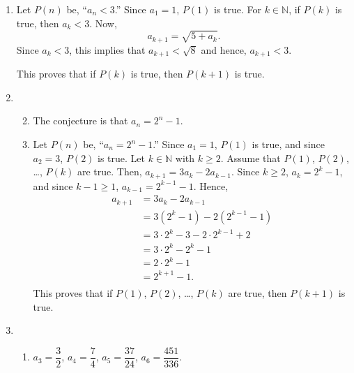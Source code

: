 \begin{enumerate}
\item Let $P \left( n \right)$ be, ``$a_n < 3$.''  Since $a_1 = 1$, $P \left( 1 \right)$ is true.  For $k \in \mathbb{N}$, if $P \left( k \right)$ is true, then $a_k < 3$.  Now,
\[
a_{k+1} = \sqrt{5 + a_k}.
\] 
Since $a_k < 3$, this implies that $a_{k+1} < \sqrt{8}$ and hence, $a_{k+1} < 3$.

This proves that if $P \left( k \right)$ is true, then $P \left( k + 1\right)$ is true.





\item 
\begin{enumerate} \setcounter{enumii}{1}
\item The conjecture is that $a_n = 2^n - 1$.

\item Let $P \left( n \right)$ be, ``$a_n = 2^n - 1$.''  Since $a_1 = 1$, $P \left( 1 \right)$ is true, and since $a_2 = 3$, $P \left( 2 \right)$ is true.  Let $k \in \mathbb{N}$ with $k \geq 2$.  Assume that $P \left( 1 \right)$, $P \left( 2 \right)$, \ldots, $P \left( k \right)$ are true.  Then, $a_{k+1} = 3 a_k - 2 a_{k-1}$.  Since $k \geq 2$, $a_k = 2^k - 1$, and since $k - 1 \geq 1$, 
$a_{k-1} = 2^{k-1} - 1$.  Hence,
\[
\begin{aligned}
a_{k+1} &= 3 a_k - 2 a_{k-1} \\
        &= 3 \left( 2^k - 1 \right) - 2 \left(2^{k-1} - 1 \right) \\
        &= 3 \cdot 2^k - 3 - 2 \cdot 2^{k-1} + 2 \\
        &= 3 \cdot 2^k - 2^k - 1 \\
        &= 2 \cdot 2^k - 1 \\
        &= 2^{k+1} - 1. \\
\end{aligned}
\]
This proves that if $P \left( 1 \right)$, $P \left( 2 \right)$, \ldots, $P \left( k \right)$ are true,  then $P \left( k + 1\right)$ is true.
\end{enumerate}



\item \begin{enumerate}
\item $a_3 = \dfrac{3}{2}$, $a_4 =\dfrac{7}{4}$, $a_5 =\dfrac{37}{24}$, $a_6 =\dfrac{451}{336}$.


\end{enumerate}
\end{enumerate}
